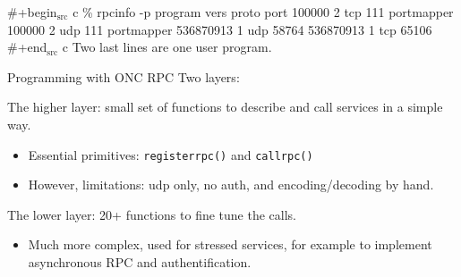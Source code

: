 \documentclass[bigger,hyperref={colorlinks=true, urlcolor=red, plainpages=false, pdfpagelabels, bookmarksnumbered}]{beamer}
\begin{document}
  \#+begin$_{\text{src}}$ c
  \% rpcinfo -p
    program vers proto   port
   100000    2   tcp    111  portmapper
   100000    2   udp    111  portmapper
536870913    1   udp  58764
536870913    1   tcp  65106
  \#+end$_{\text{src}}$ c
Two last lines are one user program.





\begin{frame}[fragile,label=sec-2-8]{Programming with ONC RPC}
 Two layers:
\begin{block}{The \alert{higher} layer: small set of functions to describe and call services in a simple way.}
\begin{itemize}
\item Essential primitives: \texttt{registerrpc()} and \texttt{callrpc()} \\
\item However, limitations: udp only, no auth, and encoding/decoding by hand.
\end{itemize}
\end{block}

\begin{block}{The \alert{lower} layer: 20+ functions to fine tune the calls.}
\begin{itemize}
\item Much more complex, used for stressed services, for example 
to implement asynchronous RPC and authentification.
\end{itemize}
\end{block}
\end{frame}
\end{document}
